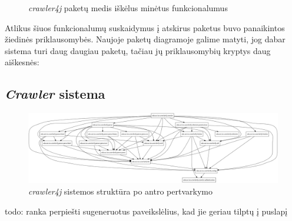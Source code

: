 \begin{figure}[H]
    \snugshade
    \endsnugshade
    \caption{\textit{crawler4j} paketų medis iškėlus minėtus funkcionalumus}
\end{figure}

Atlikus šiuos funkcionalumų suskaidymus į atskirus paketus buvo panaikintos žiedinės priklausomybės.
Naujoje paketų diagramoje galime matyti, jog dabar sistema turi daug daugiau paketų, tačiau jų priklausomybių kryptys daug aiškesnės:
\subsection{\textit{Crawler} sistema}
\begin{figure}[H]
    \centering
    \includegraphics[scale=0.2]{img/crawler_packages_v2}
    \caption{\textit{crawler4j} sistemos struktūra po antro pertvarkymo}
    \label{img:crawler_packages_v2}
\end{figure}
todo: ranka perpiešti sugeneruotus paveikslėlius, kad jie geriau tilptų į puslapį

